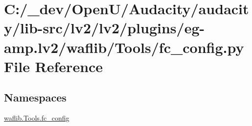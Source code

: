 \hypertarget{lv2_2plugins_2eg-amp_8lv2_2waflib_2_tools_2fc__config_8py}{}\section{C\+:/\+\_\+dev/\+Open\+U/\+Audacity/audacity/lib-\/src/lv2/lv2/plugins/eg-\/amp.lv2/waflib/\+Tools/fc\+\_\+config.py File Reference}
\label{lv2_2plugins_2eg-amp_8lv2_2waflib_2_tools_2fc__config_8py}
\subsection*{Namespaces}
\begin{DoxyCompactItemize}
\item 
 \hyperlink{namespacewaflib_1_1_tools_1_1fc__config}{waflib.\+Tools.\+fc\+\_\+config}
\end{DoxyCompactItemize}
